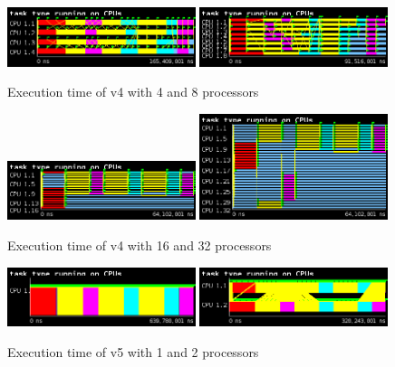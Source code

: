 \begin{figure}[H]%
    \label{fig:plot_v4_04}
    \centering
    \includegraphics[width=0.49\textwidth]{./data/3dfft_/plots/v4_04.png}
    \includegraphics[width=0.49\textwidth]{./data/3dfft_/plots/v4_08.png}
    \caption{Execution time of v4 with 4 and 8 processors}%
\end{figure}

\begin{figure}[H]%
    \label{fig:plot_v4_16}
    \centering
    \includegraphics[width=0.49\textwidth]{./data/3dfft_/plots/v4_16.png}
    \includegraphics[width=0.49\textwidth]{./data/3dfft_/plots/v4_32.png}
    \caption{Execution time of v4 with 16 and 32 processors}%
\end{figure}

\begin{figure}[H]%
    \centering
    \includegraphics[width=0.49\textwidth]{./data/3dfft_/plots/v5_01.png}
    \includegraphics[width=0.49\textwidth]{./data/3dfft_/plots/v5_02.png}
    \caption{Execution time of v5 with 1 and 2 processors}%
    \label{fig:plot_v5_01}
\end{figure}

